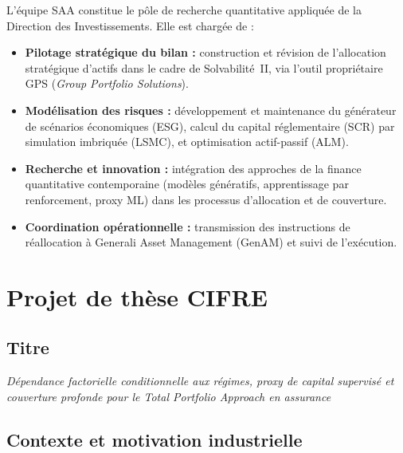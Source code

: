 \documentclass[10pt,a4paper]{article}
\begin{document}
L'équipe SAA constitue le pôle de recherche quantitative appliquée de la
Direction des Investissements.  Elle est chargée de :

\begin{itemize}[leftmargin=1.6em,itemsep=1pt]
  \item \textbf{Pilotage stratégique du bilan :} construction et révision de
        l'allocation stratégique d'actifs dans le cadre de Solvabilité~II, via
        l'outil propriétaire GPS (\textit{Group Portfolio Solutions}).
  \item \textbf{Modélisation des risques :} développement et maintenance du
        générateur de scénarios économiques (ESG), calcul du capital réglementaire
        (SCR) par simulation imbriquée (LSMC), et optimisation actif-passif (ALM).
  \item \textbf{Recherche et innovation :} intégration des approches de la
        finance quantitative contemporaine (modèles génératifs, apprentissage par
        renforcement, proxy ML) dans les processus d'allocation et de couverture.
  \item \textbf{Coordination opérationnelle :} transmission des instructions de
        réallocation à Generali Asset Management (GenAM) et suivi de l'exécution.
\end{itemize}

\section{Projet de thèse CIFRE}

\subsection{Titre}

\begin{center}
  \itshape
  Dépendance factorielle conditionnelle aux régimes, proxy de capital supervisé
  et couverture profonde pour le Total Portfolio Approach en assurance
\end{center}

\subsection{Contexte et motivation industrielle}
\end{document}
